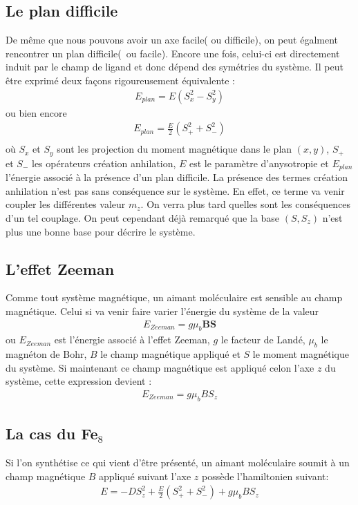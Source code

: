 \subsection{Le plan difficile}
De m\^eme que nous pouvons avoir un axe facile( ou difficile), on peut égalment rencontrer un plan difficile(~ou facile). Encore une fois, celui-ci est directement induit par le champ de ligand et donc dépend des symétries du système. Il peut \^etre exprimé deux façons rigoureusement équivalente :
\begin{eqnarray}
E_{plan} = E ( S_x^2 -S_y^2) \nonumber
\end{eqnarray}
ou bien encore
\begin{eqnarray}
E_{plan} = \frac{E}{2} ( S_+^2  + S_-^2) \nonumber \\
\end{eqnarray}
où $S_x$ et $S_y$ sont les projection du moment magnétique dans le plan $(x,y)$, $S_+$ et $S_-$ les opérateurs création anhilation, $E$ est le paramètre d'anysotropie et $E_{plan}$ l'énergie associé à la présence d'un plan difficile. La présence des termes création anhilation n'est pas sans conséquence sur le système. En effet, ce terme va venir coupler les différentes valeur $m_z$. On verra plus tard quelles sont les conséquences d'un tel couplage. On peut cependant déjà remarqué que la base $(S,S_z)$ n'est plus une bonne base pour décrire le système.

\subsection{L'effet Zeeman}
Comme tout système magnétique, un aimant moléculaire est sensible au champ magnétique. Celui si va venir faire varier l'énergie du système de la valeur
\begin{eqnarray}
E_{Zeeman}= g\mu_b \mathbf{BS} \nonumber
\end{eqnarray}
ou $E_{Zeeman}$ est l'énergie associé à l'effet Zeeman, $g$ le facteur de Landé, $\mu_b$ le magnéton de Bohr, $B$ le champ magnétique appliqué et $S$ le moment magnétique du système. Si maintenant ce champ magnétique est appliqué celon l'axe $z$ du système, cette expression devient :
\begin{eqnarray}
E_{Zeeman}= g\mu_b B S_z \nonumber
\end{eqnarray}

\subsection{La cas du Fe$_8$}
Si l'on synthétise ce qui vient d'\^etre présenté, un aimant moléculaire soumit à un champ magnétique $B$ appliqué suivant l'axe $z$ possède l'hamiltonien suivant:
\begin{eqnarray}
E =  -DS_z^2 + \frac{E}{2} ( S_+^2  + S_-^2) + g\mu_b B S_z 
\end{eqnarray}



